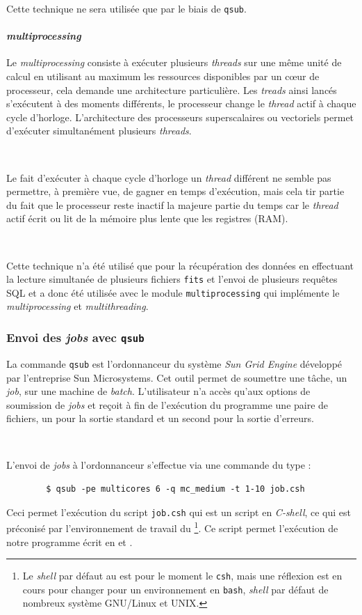 Cette technique ne sera utilisée que par le biais de \texttt{qsub}.

			\paragraph{\emph{multiprocessing}}
Le \emph{multiprocessing} consiste à exécuter plusieurs \emph{threads} sur une même unité de calcul en utilisant au maximum les ressources disponibles par un c\oe{}ur de processeur, cela demande une architecture particulière. Les \emph{treads} ainsi lancés s'exécutent à des moments différents, le processeur change le \emph{thread} actif à chaque cycle d'horloge. L'architecture des processeurs superscalaires ou vectoriels permet d'exécuter simultanément plusieurs \emph{threads}.

\

Le fait d'exécuter à chaque cycle d'horloge un \emph{thread} différent ne semble pas permettre, à première vue, de gagner en temps d'exécution, mais cela tir partie du fait que le processeur reste inactif la majeure partie du temps car le \emph{thread} actif écrit ou lit de la mémoire plus lente que les registres (RAM).

\

Cette technique n'a été utilisé que pour la récupération des données en effectuant la lecture simultanée de plusieurs fichiers \texttt{fits} et l'envoi de plusieurs requêtes SQL et a donc été utilisée avec le module \Python{} \texttt{multiprocessing} qui implémente le \emph{multiprocessing} et \emph{multithreading}.

		\subsubsection{Envoi des \emph{jobs} avec \texttt{qsub}}

La commande \texttt{qsub} est l'ordonnanceur du système \emph{Sun Grid Engine} développé par l'entreprise Sun Microsystems. Cet outil permet de soumettre une tâche, un \emph{job}, sur une machine de \emph{batch}. L'utilisateur n'a accès qu'aux options de soumission de \emph{jobs} et reçoit à fin de l'exécution du programme une paire de fichiers, un pour la sortie standard et un second pour la sortie d'erreurs.

\

L'envoi de \emph{jobs} à l'ordonnanceur s'effectue via une commande du type :
	\begin{verbatim}
		$ qsub -pe multicores 6 -q mc_medium -t 1-10 job.csh
	\end{verbatim} %
Ceci permet l'exécution du script \texttt{job.csh} qui est un script en \emph{C-shell}, ce qui est préconisé par l'environnement de travail du \CC{}\footnote{Le \emph{shell} par défaut au \CC{} est pour le moment le \texttt{csh}, mais une réflexion est en cours pour changer pour un environnement en \texttt{bash}, \emph{shell} par défaut de nombreux système GNU/Linux et UNIX.}. Ce script permet l'exécution de notre programme écrit en \Python{} et \Cpp{}.

